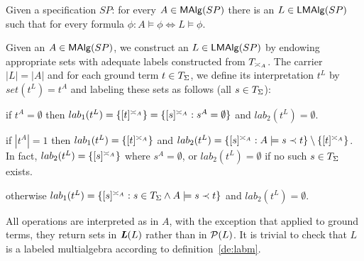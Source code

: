 \documentclass[10pt]{article}
\begin{document}
\begin{Prop}
Given a specification $SP$: for every $A\in{\sf MAlg}(SP)$ there is an $L\in{\sf LMAlg}(SP)$ such
that for every formula $\phi:A\models\phi\iff L\models \phi$.
\end{Prop}
\begin{Proof}
Given an $A\in{\sf MAlg}(SP)$, we construct an $L\in{\sf LMAlg}(SP)$ by endowing appropriate sets
with adequate labels constructed from $T_{{\asymp_{A}}}$. The carrier
$|L|=|A|$ and for each ground
term $t\in T_{\Sigma}$, we define its interpretation  $t^L$ by
$set(t^L)=t^A$ and labeling these sets as follows (all $s\in T_{\Sigma}$):
\begin{enum}
\item if $t^A=\emptyset$ then $lab_1(t^L)=\{[t]^{\asymp_{A}}\}=\{[s]^{\asymp_{A}}:s^A=\emptyset\}$ and $lab_2(t^L)=\emptyset$.
\item if $|t^A|=1$ then  $lab_1(t^L)=\{[t]^{\asymp_{A}}\}$ and
$lab_2(t^L)=\{[s]^{\asymp_{A}}:A\models s\prec t\}\setminus\{[t]^{\asymp_{A}}\}$. In
fact, $lab_2(t^L) = \{[s]^{\asymp_{A}}\}$ where $s^A=\emptyset$, or $lab_2(t^L)=\emptyset$ if no such
$s\in T_{\Sigma}$ exists.
\item otherwise $lab_1(t^L)=\{[s]^{\asymp_{A}}:s\in T_{\Sigma}\land A\models
s\prec t\}$ and $lab_2(t^L)=\emptyset$.
\end{enum}
All operations are interpreted as in $A$, with the exception that applied to
ground terms, they return sets in $\mbox{\bf{\em L}}(L)$ rather than in ${\mathcal{P}}(L)$. It is
trivial to check that $L$ is a labeled multialgebra according to definition~\ref{de:labm}.


\end{Proof}
\end{document}

